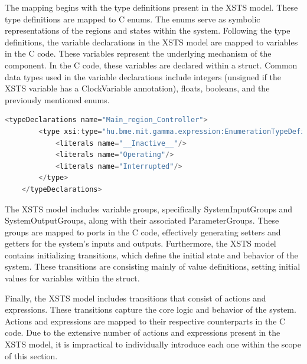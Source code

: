 The mapping begins with the type definitions present in the XSTS model. These type definitions are mapped to C enums. The enums serve as symbolic representations of the regions and states within the system. Following the type definitions, the variable declarations in the XSTS model are mapped to variables in the C code. These variables represent the underlying mechanism of the component. In the C code, these variables are declared within a struct. Common data types used in the variable declarations include integers (unsigned if the XSTS variable has a ClockVariable annotation), floats, booleans, and the previously mentioned enums.
\bigskip

\begin{lstlisting}[language=C, caption={Representation of regions in XSTS.}]
	<typeDeclarations name="Main_region_Controller">
		<type xsi:type="hu.bme.mit.gamma.expression:EnumerationTypeDefinition">
			<literals name="__Inactive__"/>
			<literals name="Operating"/>
			<literals name="Interrupted"/>
		</type>
	</typeDeclarations>
\end{lstlisting}

The XSTS model includes variable groups, specifically SystemInputGroups and SystemOutputGroups, along with their associated ParameterGroups. These groups are mapped to ports in the C code, effectively generating setters and getters for the system's inputs and outputs. Furthermore, the XSTS model contains initializing transitions, which define the initial state and behavior of the system. These transitions are consisting mainly of value definitions, setting initial values for variables within the struct.

Finally, the XSTS model includes transitions that consist of actions and expressions. These transitions capture the core logic and behavior of the system. Actions and expressions are mapped to their respective counterparts in the C code. Due to the extensive number of actions and expressions present in the XSTS model, it is impractical to individually introduce each one within the scope of this section.

